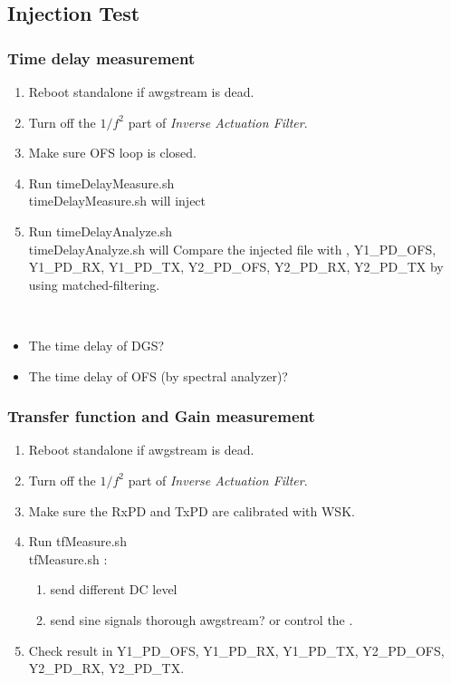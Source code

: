 \subsection{Injection Test}
    \subsubsection{Time delay measurement}
        \begin{enumerate}
            \item Reboot standalone if awgstream is dead.  
            \item Turn off the $1/f^2$ part of \emph{Inverse Actuation Filter}.
            \item Make sure OFS loop is closed.
            \item Run timeDelayMeasure.sh \\
            timeDelayMeasure.sh will inject 
            \item Run timeDelayAnalyze.sh \\ 
            timeDelayAnalyze.sh will Compare the injected file with , Y1\_PD\_OFS, Y1\_PD\_RX, Y1\_PD\_TX, Y2\_PD\_OFS, Y2\_PD\_RX, Y2\_PD\_TX by using matched-filtering. 
        \end{enumerate}
        \\
        \begin{itemize}
            \item The time delay of DGS?
            \item The time delay of OFS (by spectral analyzer)?
        \end{itemize}
        
     \subsubsection{Transfer function and Gain measurement}
        \begin{enumerate}
            \item Reboot standalone if awgstream is dead.  
            \item Turn off the $1/f^2$ part of \emph{Inverse Actuation Filter}.
            \item Make sure the RxPD and TxPD are calibrated with WSK.
            \item Run tfMeasure.sh \\
                \subitem tfMeasure.sh :
                \begin{enumerate}
                    \item send different DC level  
                    \item send  sine signals thorough awgstream? or control the .            
                \end{enumerate}
            \item Check result in Y1\_PD\_OFS, Y1\_PD\_RX, Y1\_PD\_TX, Y2\_PD\_OFS, Y2\_PD\_RX, Y2\_PD\_TX. 
        \end{enumerate}
        \\

